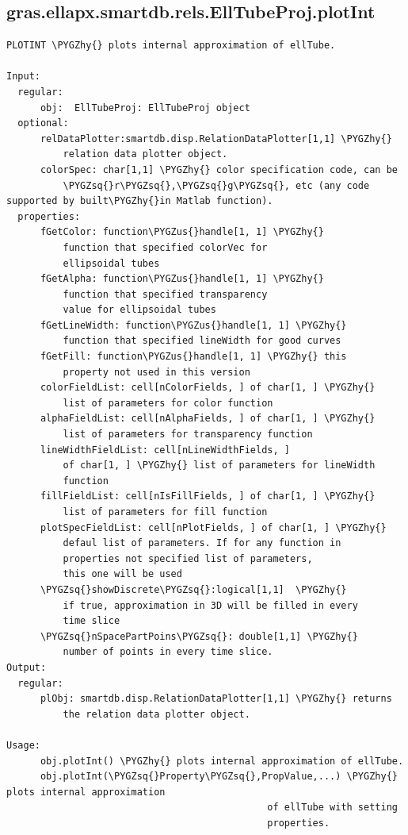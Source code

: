 \documentclass[letterpaper,10pt,english]{sphinxmanual}
\def\PYGZus{\char`\_}
\def\PYGZhy{\char`\-}
\def\PYGZsq{\char`\'}
\begin{document}
\subsection{gras.ellapx.smartdb.rels.EllTubeProj.plotInt}
\label{chap_functions:gras-ellapx-smartdb-rels-elltubeproj-plotint}
\begin{Verbatim}[commandchars=\\\{\}]
PLOTINT \PYGZhy{} plots internal approximation of ellTube.

Input:
  regular:
      obj:  EllTubeProj: EllTubeProj object
  optional:
      relDataPlotter:smartdb.disp.RelationDataPlotter[1,1] \PYGZhy{}
          relation data plotter object.
      colorSpec: char[1,1] \PYGZhy{} color specification code, can be
          \PYGZsq{}r\PYGZsq{},\PYGZsq{}g\PYGZsq{}, etc (any code supported by built\PYGZhy{}in Matlab function).
  properties:
      fGetColor: function\PYGZus{}handle[1, 1] \PYGZhy{}
          function that specified colorVec for
          ellipsoidal tubes
      fGetAlpha: function\PYGZus{}handle[1, 1] \PYGZhy{}
          function that specified transparency
          value for ellipsoidal tubes
      fGetLineWidth: function\PYGZus{}handle[1, 1] \PYGZhy{}
          function that specified lineWidth for good curves
      fGetFill: function\PYGZus{}handle[1, 1] \PYGZhy{} this
          property not used in this version
      colorFieldList: cell[nColorFields, ] of char[1, ] \PYGZhy{}
          list of parameters for color function
      alphaFieldList: cell[nAlphaFields, ] of char[1, ] \PYGZhy{}
          list of parameters for transparency function
      lineWidthFieldList: cell[nLineWidthFields, ]
          of char[1, ] \PYGZhy{} list of parameters for lineWidth
          function
      fillFieldList: cell[nIsFillFields, ] of char[1, ] \PYGZhy{}
          list of parameters for fill function
      plotSpecFieldList: cell[nPlotFields, ] of char[1, ] \PYGZhy{}
          defaul list of parameters. If for any function in
          properties not specified list of parameters,
          this one will be used
      \PYGZsq{}showDiscrete\PYGZsq{}:logical[1,1]  \PYGZhy{}
          if true, approximation in 3D will be filled in every
          time slice
      \PYGZsq{}nSpacePartPoins\PYGZsq{}: double[1,1] \PYGZhy{}
          number of points in every time slice.
Output:
  regular:
      plObj: smartdb.disp.RelationDataPlotter[1,1] \PYGZhy{} returns
          the relation data plotter object.

Usage:
      obj.plotInt() \PYGZhy{} plots internal approximation of ellTube.
      obj.plotInt(\PYGZsq{}Property\PYGZsq{},PropValue,...) \PYGZhy{} plots internal approximation
                                              of ellTube with setting
                                              properties.
\end{Verbatim}
\end{document}
